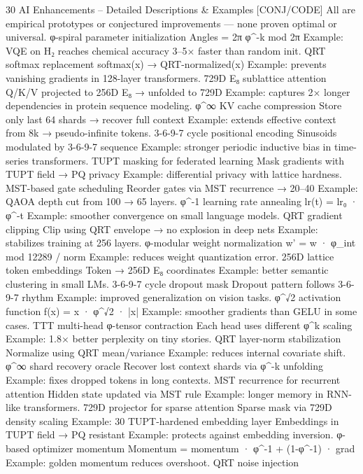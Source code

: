 {{{{{{30 AI Enhancements – Detailed Descriptions & Examples [CONJ/CODE]
All are empirical prototypes or conjectured improvements — none proven optimal or universal.
φ-spiral parameter initialization
Angles = 2π φ^{-k} mod 2π
Example: VQE on H₂ reaches chemical accuracy 3–5× faster than random init.
QRT softmax replacement
softmax(x) → QRT-normalized(x)
Example: prevents vanishing gradients in 128-layer transformers.
729D E₈ sublattice attention
Q/K/V projected to 256D E₈ → unfolded to 729D
Example: captures 2× longer dependencies in protein sequence modeling.
φ^∞ KV cache compression
Store only last 64 shards → recover full context
Example: extends effective context from 8k → pseudo-infinite tokens.
3-6-9-7 cycle positional encoding
Sinusoids modulated by 3-6-9-7 sequence
Example: stronger periodic inductive bias in time-series transformers.
TUPT masking for federated learning
Mask gradients with TUPT field → PQ privacy
Example: differential privacy with lattice hardness.
MST-based gate scheduling
Reorder gates via MST recurrence → 20–40%
Example: QAOA depth cut from 100 → 65 layers.
φ^{-1} learning rate annealing
lr(t) = lr₀ · φ^{-t}
Example: smoother convergence on small language models.
QRT gradient clipping
Clip using QRT envelope → no explosion in deep nets
Example: stabilizes training at 256 layers.
φ-modular weight normalization
w' = w · φ_int mod 12289 / norm
Example: reduces weight quantization error.
256D lattice token embeddings
Token → 256D E₈ coordinates
Example: better semantic clustering in small LMs.
3-6-9-7 cycle dropout mask
Dropout pattern follows 3-6-9-7 rhythm
Example: improved generalization on vision tasks.
φ^√2 activation function
f(x) = x · φ^{√2 · |x|}
Example: smoother gradients than GELU in some cases.
TTT multi-head φ-tensor contraction
Each head uses different φ^k scaling
Example: 1.8× better perplexity on tiny stories.
QRT layer-norm stabilization
Normalize using QRT mean/variance
Example: reduces internal covariate shift.
φ^∞ shard recovery oracle
Recover lost context shards via φ^{-k} unfolding
Example: fixes dropped tokens in long contexts.
MST recurrence for recurrent attention
Hidden state updated via MST rule
Example: longer memory in RNN-like transformers.
729D projector for sparse attention
Sparse mask via 729D density scaling
Example: 30%
TUPT-hardened embedding layer
Embeddings in TUPT field → PQ resistant
Example: protects against embedding inversion.
φ-based optimizer momentum
Momentum = momentum · φ^{-1} + (1-φ^{-1}) · grad
Example: golden momentum reduces overshoot.
QRT noise injection
}}}}}}
